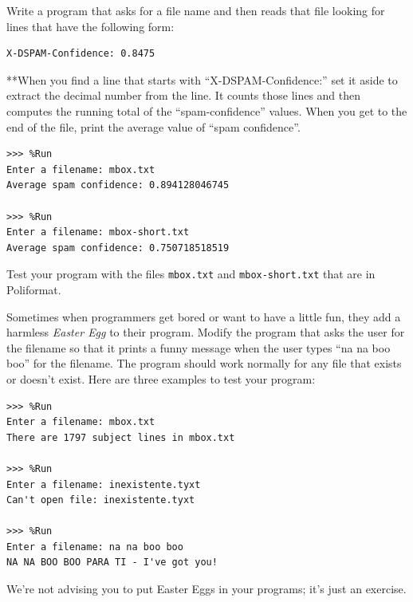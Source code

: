 \begin{exercise}
Write a program that asks for a file name and then reads that file looking for lines that have the following form:

\begin{Verbatim}[frame=single]
X-DSPAM-Confidence: 0.8475
\end{Verbatim}

**When you find a line that starts with ``X-DSPAM-Confidence:'' set it aside to extract the decimal number from the line. It counts those lines and then computes the running total of the ``spam-confidence'' values. When you get to the end of the file, print the average value of ``spam confidence''.

\begin{Verbatim}[frame=single]
>>> %Run
Enter a filename: mbox.txt
Average spam confidence: 0.894128046745

>>> %Run
Enter a filename: mbox-short.txt
Average spam confidence: 0.750718518519
\end{Verbatim}

Test your program with the files \texttt{mbox.txt} and
\texttt{mbox-short.txt} that are in Poliformat.
\end{exercise}


\begin{exercise}
Sometimes when programmers get bored or want to have a little fun, they add a harmless \emph{Easter Egg} to their program. Modify the program that asks the user for the filename so that it prints a funny message when the user types ``na na boo boo'' for the filename. The program should work normally for any file that exists or doesn't exist. Here are three examples to test your program:

\begin{Verbatim}[frame=single]
>>> %Run 
Enter a filename: mbox.txt
There are 1797 subject lines in mbox.txt

>>> %Run 
Enter a filename: inexistente.tyxt
Can't open file: inexistente.tyxt

>>> %Run 
Enter a filename: na na boo boo
NA NA BOO BOO PARA TI - I've got you!
\end{Verbatim}

We're not advising you to put Easter Eggs in your programs; it's just an exercise.
\end{exercise}



